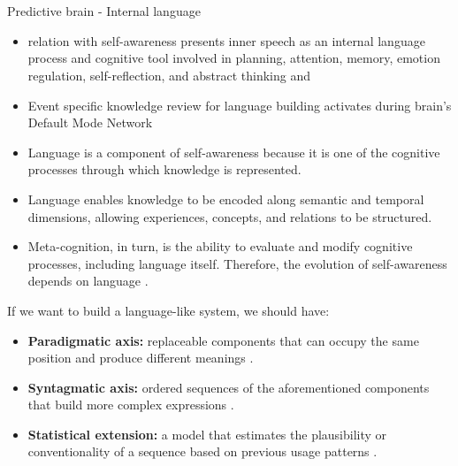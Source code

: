 \section{}
    \begin{frame}[allowframebreaks]{Predictive brain - Internal language}
        \begin{itemize}
            \item relation with self-awareness  presents inner speech as an internal language process and cognitive tool involved in planning, attention, memory, emotion regulation, self-reflection, and abstract thinking and
            \item Event specific knowledge review for language building activates during brain's Default Mode Network \cite{menon-2023-20-years-of-the-default-mode-network-a-review-and-synthesis, molnar-szakacs-2013-self-processing-and-the-default-mode-network-interactions-with-the-mirror-neuron-system}
            \item Language is a component of self-awareness because it is one of the cognitive processes through which knowledge is represented.
            \item Language enables knowledge to be encoded along semantic and temporal dimensions, allowing experiences, concepts, and relations to be structured.
            \item Meta-cognition, in turn, is the ability to evaluate and modify cognitive processes, including language itself. Therefore, the evolution of self-awareness depends on language \cite{fernyhough-2023-inner-speech-as-language-process-and-cognitive-tool}.
        \end{itemize}
        
        If we want to build a language-like system, we should have:
        \begin{itemize}
            \item \textbf{Paradigmatic axis:} replaceable components that can occupy the same position and produce different meanings \cite{saussure-1966-course-in-general-linguistics}.
            \item \textbf{Syntagmatic axis:} ordered sequences of the aforementioned components that build more complex expressions \cite{saussure-1966-course-in-general-linguistics}.
            \item \textbf{Statistical extension:} a model that estimates the plausibility or conventionality of a sequence based on previous usage patterns \cite{mickus-2024-language-models-and-the-paradigmatic-axisself}.
        \end{itemize}
        

\end{frame}
